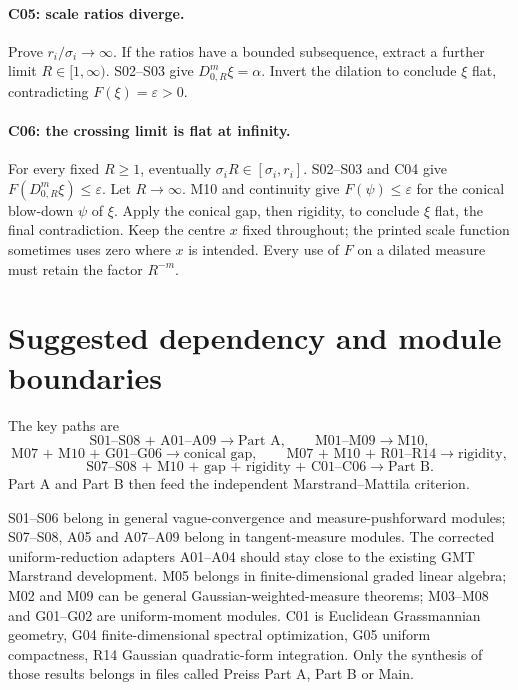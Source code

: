 \paragraph{C05: scale ratios diverge.}
Prove $r_i/\sigma_i\to\infty$. If the ratios have a bounded subsequence,
extract a further limit $R\in[1,\infty)$. S02--S03 give
$D^m_{0,R}\xi=\alpha$. Invert the dilation to conclude $\xi$ flat,
contradicting $F(\xi)=\varepsilon>0$.

\paragraph{C06: the crossing limit is flat at infinity.}
For every fixed $R\geq1$, eventually $\sigma_i R\in[\sigma_i,r_i]$.
S02--S03 and C04 give $F(D^m_{0,R}\xi)\leq\varepsilon$.
Let $R\to\infty$. M10 and continuity give $F(\psi)\leq\varepsilon$ for
the conical blow-down $\psi$ of $\xi$. Apply the conical gap, then rigidity,
to conclude $\xi$ flat, the final contradiction.
Keep the centre $x$ fixed throughout; the printed scale function sometimes
uses zero where $x$ is intended. Every use of $F$ on a dilated measure must
retain the factor $R^{-m}$.

\section{Suggested dependency and module boundaries}
The key paths are
\[
 \text{S01--S08 + A01--A09}\longrightarrow\text{Part A},\qquad
 \text{M01--M09}\longrightarrow\text{M10},
\]
\[
 \text{M07 + M10 + G01--G06}\longrightarrow\text{conical gap},\qquad
 \text{M07 + M10 + R01--R14}\longrightarrow\text{rigidity},
\]
\[
 \text{S07--S08 + M10 + gap + rigidity + C01--C06}
 \longrightarrow\text{Part B}.
\]
Part A and Part B then feed the independent Marstrand--Mattila criterion.

S01--S06 belong in general vague-convergence and measure-pushforward modules;
S07--S08, A05 and A07--A09 belong in tangent-measure modules. The corrected
uniform-reduction adapters A01--A04 should stay close to the existing GMT
Marstrand development. M05 belongs in finite-dimensional graded linear algebra;
M02 and M09 can be general Gaussian-weighted-measure theorems; M03--M08 and
G01--G02 are uniform-moment modules. C01 is Euclidean Grassmannian geometry,
G04 finite-dimensional spectral optimization, G05 uniform compactness,
R14 Gaussian quadratic-form integration. Only the synthesis of those results
belongs in files called Preiss Part A, Part B or Main.


